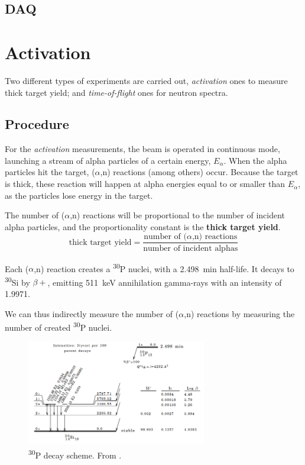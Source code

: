 \documentclass[a4paper,12pt]{report}
\newcommand{\an}{($\alpha$,n) }
\newcommand{\Piso}{\textsuperscript{30}P }
\begin{document}
\section{DAQ}


\chapter{Activation}
Two different types of experiments are carried out, \textit{activation} ones to measure thick target yield; and \textit{time-of-flight} ones for neutron spectra.

\section{Procedure}
For the \textit{activation} measurements, the beam is operated in continuous mode, launching a stream of alpha particles of a certain energy, $E_\alpha$.
When the alpha particles hit the target, \an reactions (among others) occur.
Because the target is thick, these reaction will happen at alpha energies equal to or smaller than $E_\alpha$, as the particles lose energy in the target.

The number of \an reactions will be proportional to the number of incident alpha particles, and the proportionality constant is the \textbf{thick target yield}.
\begin{equation}
	\text{thick target yield} = \frac{\text{number of \an reactions}}{\text{number of incident alphas}}
\end{equation}

Each \an reaction creates a \Piso nuclei, with a \qty{2.498}{\minute} half-life.
It decays to \textsuperscript{30}Si by $\beta +$, emitting \qty{511}{\keV} annihilation gamma-rays with an intensity of \num{1.9971}.\cite{nucleardatasheets}

We can thus indirectly measure the number of \an reactions by measuring the number of created \Piso nuclei.
\\

\begin{figure}[H]
	\centering
	\includegraphics[width=0.7\textwidth]{Piso_decay_scheme.png}
	\caption{\Piso decay scheme.
	From \cite{nucleardatasheets}.}
	\label{Piso_decay_scheme}
\end{figure}
\end{document}
